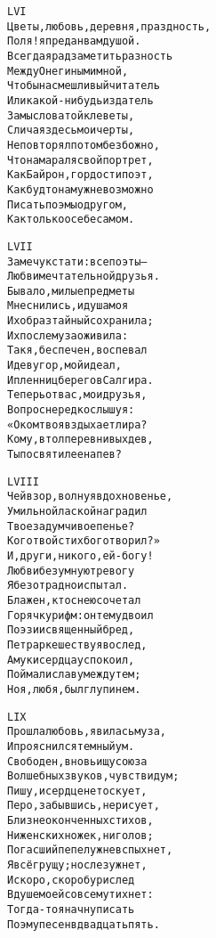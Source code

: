 \begin{minipage}[t]{\dimexpr 0.5\textwidth -\tabcolsep-.5pt}
\begin{alltt}\normalfont\centering
LVI
Цветы, любовь, деревня, праздность,
Поля! я предан вам душой.
Всегда я рад заметить разность
Между Онегиным и мной,
Чтобы насмешливый читатель
Или какой-нибудь издатель
Замысловатой клеветы,
Сличая здесь мои черты,
Не повторял потом безбожно,
Что намарал я свой портрет,
Как Байрон, гордости поэт,
Как будто нам уж невозможно
Писать поэмы о другом,
Как только о себе самом.
\end{alltt}
\end{minipage}
\clearpage

\begin{minipage}[t]{\dimexpr 0.5\textwidth -\tabcolsep-.5pt}
\begin{alltt}\normalfont\centering
LVII
Замечу кстати: все поэты —
Любви мечтательной друзья.
Бывало, милые предметы
Мне снились, и душа моя
Их образ тайный сохранила;
Их после муза оживила:
Так я, беспечен, воспевал
И деву гор, мой идеал,
И пленниц берегов Салгира.
Теперь от вас, мои друзья,
Вопрос нередко слышу я:
«О ком твоя вздыхает лира?
Кому, в толпе ревнивых дев,
Ты посвятил ее напев?
\end{alltt}
\end{minipage}

\begin{minipage}[t]{\dimexpr 0.5\textwidth -\tabcolsep-.5pt}
\begin{alltt}\normalfont\centering
LVIII
Чей взор, волнуя вдохновенье,
Умильной лаской наградил
Твое задумчивое пенье?
Кого твой стих боготворил?»
И, други, никого, ей-богу!
Любви безумную тревогу
Я безотрадно испытал.
Блажен, кто с нею сочетал
Горячку рифм: он тем удвоил
Поэзии священный бред,
Петрарке шествуя вослед,
А муки сердца успокоил,
Поймал и славу между тем;
Но я, любя, был глуп и нем.
\end{alltt}
\end{minipage}
\clearpage

\begin{minipage}[t]{\dimexpr 0.5\textwidth -\tabcolsep-.5pt}
\begin{alltt}\normalfont\centering
LIX
Прошла любовь, явилась муза,
И прояснился темный ум.
Свободен, вновь ищу союза
Волшебных звуков, чувств и дум;
Пишу, и сердце не тоскует,
Перо, забывшись, не рисует,
Близ неоконченных стихов,
Ни женских ножек, ни голов;
Погасший пепел уж не вспыхнет,
Я всё грущу; но слез уж нет,
И скоро, скоро бури след
В душе моей совсем утихнет:
Тогда-то я начну писать
Поэму песен в двадцать пять.
\end{alltt}
\end{minipage}

